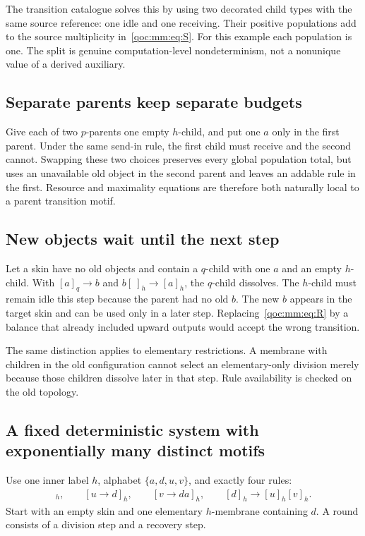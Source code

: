 \documentclass[11pt,letterpaper]{article}
\theoremstyle{definition}
\theoremstyle{remark}
\begin{document}
The transition catalogue solves this by using two decorated child types with the same source reference: one idle and one receiving. Their positive populations add to the source multiplicity in~\eqref{qoc:mm:eq:S}. For this example each population is one. The split is genuine computation-level nondeterminism, not a nonunique value of a derived auxiliary.

\subsection{Separate parents keep separate budgets}
Give each of two $p$-parents one empty $h$-child, and put one $a$ only in the first parent. Under the same send-in rule, the first child must receive and the second cannot. Swapping these two choices preserves every global population total, but uses an unavailable old object in the second parent and leaves an addable rule in the first. Resource and maximality equations are therefore both naturally local to a parent transition motif.

\subsection{New objects wait until the next step}
Let a skin have no old objects and contain a $q$-child with one $a$ and an empty $h$-child. With $[a]_q\to b$ and $b[\ ]_h\to[a]_h$, the $q$-child dissolves. The $h$-child must remain idle this step because the parent had no old $b$. The new $b$ appears in the target skin and can be used only in a later step. Replacing~\eqref{qoc:mm:eq:R} by a balance that already included upward outputs would accept the wrong transition.

The same distinction applies to elementary restrictions. A membrane with children in the old configuration cannot select an elementary-only division merely because those children dissolve later in that step. Rule availability is checked on the old topology.

\subsection{A fixed deterministic system with exponentially many distinct motifs}
Use one inner label $h$, alphabet $\{a,d,u,v\}$, and exactly four rules:
\begin{align*}
 [a\to aa]_h,\qquad [u\to d]_h,\qquad [v\to da]_h,\qquad
 [d]_h\to[u]_h[v]_h.
\end{align*}
Start with an empty skin and one elementary $h$-membrane containing $d$. A round consists of a division step and a recovery step.
\end{document}
